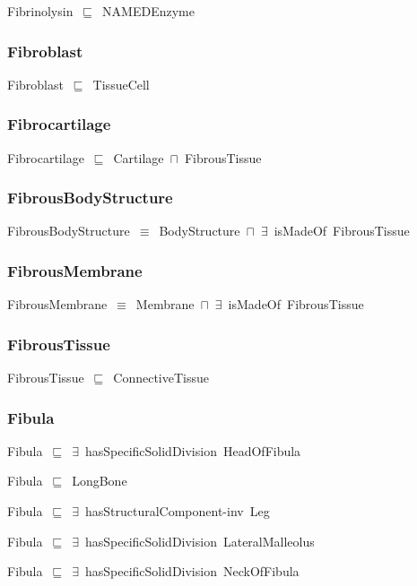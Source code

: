 \documentclass{article}
\begin{document}
Fibrinolysin~\ensuremath{\sqsubseteq}~NAMEDEnzyme~

\subsubsection*{Fibroblast}

Fibroblast~\ensuremath{\sqsubseteq}~TissueCell~

\subsubsection*{Fibrocartilage}

Fibrocartilage~\ensuremath{\sqsubseteq}~Cartilage~\ensuremath{\sqcap}~FibrousTissue~

\subsubsection*{FibrousBodyStructure}

FibrousBodyStructure~\ensuremath{\equiv}~BodyStructure~\ensuremath{\sqcap}~\ensuremath{\exists}~isMadeOf~FibrousTissue

\subsubsection*{FibrousMembrane}

FibrousMembrane~\ensuremath{\equiv}~Membrane~\ensuremath{\sqcap}~\ensuremath{\exists}~isMadeOf~FibrousTissue

\subsubsection*{FibrousTissue}

FibrousTissue~\ensuremath{\sqsubseteq}~ConnectiveTissue~

\subsubsection*{Fibula}

Fibula~\ensuremath{\sqsubseteq}~\ensuremath{\exists}~hasSpecificSolidDivision~HeadOfFibula~

Fibula~\ensuremath{\sqsubseteq}~LongBone~

Fibula~\ensuremath{\sqsubseteq}~\ensuremath{\exists}~hasStructuralComponent-inv~Leg~

Fibula~\ensuremath{\sqsubseteq}~\ensuremath{\exists}~hasSpecificSolidDivision~LateralMalleolus~

Fibula~\ensuremath{\sqsubseteq}~\ensuremath{\exists}~hasSpecificSolidDivision~NeckOfFibula~
\end{document}
